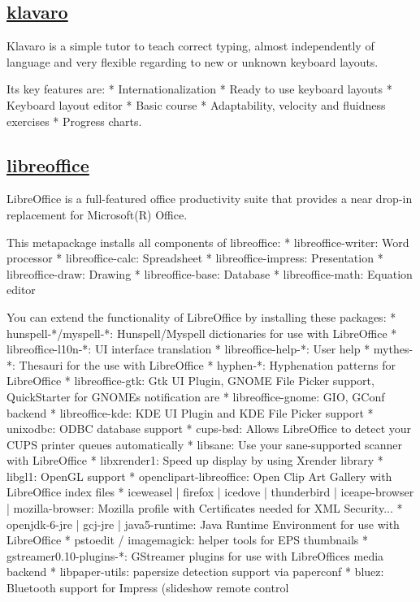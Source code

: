 \subsection{\href{http://klavaro.sourceforge.net/}{klavaro}}

 Klavaro is a simple tutor to teach correct typing, almost independently of
 language and very flexible regarding to new or unknown keyboard layouts.
 
 Its key features are:
  * Internationalization
  * Ready to use keyboard layouts
  * Keyboard layout editor
  * Basic course
  * Adaptability, velocity and fluidness exercises
  * Progress charts.

\subsection{\href{http://www.libreoffice.org}{libreoffice}}

 LibreOffice is a full-featured office productivity suite that provides
 a near drop-in replacement for Microsoft(R) Office.
 
 This metapackage installs all components of libreoffice:
  * libreoffice-writer: Word processor
  * libreoffice-calc: Spreadsheet
  * libreoffice-impress: Presentation
  * libreoffice-draw: Drawing
  * libreoffice-base: Database
  * libreoffice-math: Equation editor
 
 You can extend the functionality of LibreOffice by installing these
 packages:
  * hunspell-*/myspell-*: Hunspell/Myspell dictionaries
    for use with LibreOffice
  * libreoffice-l10n-*: UI interface translation
  * libreoffice-help-*: User help
  * mythes-*: Thesauri for the use with LibreOffice
  * hyphen-*: Hyphenation patterns for LibreOffice
  * libreoffice-gtk: Gtk UI Plugin, GNOME File Picker support,
    QuickStarter for GNOMEs notification are
  * libreoffice-gnome: GIO, GConf backend
  * libreoffice-kde: KDE UI Plugin and KDE File Picker support
  * unixodbc: ODBC database support
  * cups-bsd: Allows LibreOffice to detect your CUPS printer queues
    automatically
  * libsane: Use your sane-supported scanner with LibreOffice
  * libxrender1: Speed up display by using Xrender library
  * libgl1: OpenGL support
  * openclipart-libreoffice: Open Clip Art Gallery with LibreOffice index
    files
  * iceweasel | firefox | icedove | thunderbird | iceape-browser | mozilla-browser:
    Mozilla profile with Certificates needed for XML Security...
  * openjdk-6-jre | gcj-jre | java5-runtime:
    Java Runtime Environment for use with LibreOffice
  * pstoedit / imagemagick: helper tools for EPS thumbnails
  * gstreamer0.10-plugins-*: GStreamer plugins for use with LibreOffices
    media backend
  * libpaper-utils: papersize detection support via paperconf
  * bluez: Bluetooth support for Impress (slideshow remote control

